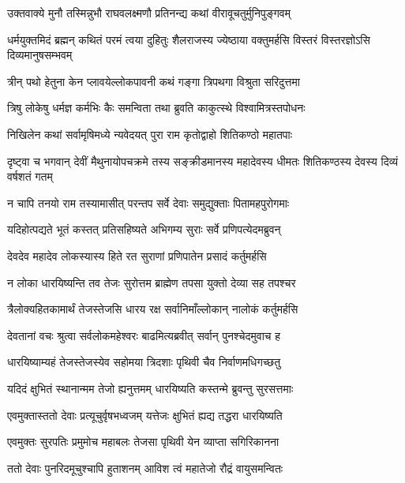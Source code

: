 
\twolineshloka
{उक्तवाक्ये मुनौ तस्मिन्नुभौ राघवलक्ष्मणौ}
{प्रतिनन्द्य कथां वीरावूचतुर्मुनिपुङ्गवम्} %

\threelineshloka
{धर्मयुक्तमिदं ब्रह्मन् कथितं परमं त्वया}
{दुहितुः शैलराजस्य ज्येष्ठाया वक्तुमर्हसि}
{विस्तरं विस्तरज्ञोऽसि दिव्यमानुषसम्भवम्} %

\twolineshloka
{त्रीन् पथो हेतुना केन प्लावयेल्लोकपावनी}
{कथं गङ्गा त्रिपथगा विश्रुता सरिदुत्तमा} %

\twolineshloka
{त्रिषु लोकेषु धर्मज्ञ कर्मभिः कैः समन्विता}
{तथा ब्रुवति काकुत्स्थे विश्वामित्रस्तपोधनः} %

\twolineshloka
{निखिलेन कथां सर्वामृषिमध्ये न्यवेदयत्}
{पुरा राम कृतोद्वाहो शितिकण्ठो महातपाः} %

\threelineshloka
{दृष्ट्वा च भगवान् देवीं मैथुनायोपचक्रमे}
{तस्य सङ्क्रीडमानस्य महादेवस्य धीमतः}
{शितिकण्ठस्य देवस्य दिव्यं वर्षशतं गतम्} %

\twolineshloka
{न चापि तनयो राम तस्यामासीत् परन्तप}
{सर्वे देवाः समुद्युक्ताः पितामहपुरोगमाः} %

\twolineshloka
{यदिहोत्पद्यते भूतं कस्तत् प्रतिसहिष्यते}
{अभिगम्य सुराः सर्वे प्रणिपत्येदमब्रुवन्} %

\twolineshloka
{देवदेव महादेव लोकस्यास्य हिते रत}
{सुराणां प्रणिपातेन प्रसादं कर्तुमर्हसि} %

\twolineshloka
{न लोका धारयिष्यन्ति तव तेजः सुरोत्तम}
{ब्राह्मेण तपसा युक्तो देव्या सह तपश्चर} %

\twolineshloka
{त्रैलोक्यहितकामार्थं तेजस्तेजसि धारय}
{रक्ष सर्वानिमाँल्लोकान् नालोकं कर्तुमर्हसि} %

\twolineshloka
{देवतानां वचः श्रुत्वा सर्वलोकमहेश्वरः}
{बाढमित्यब्रवीत् सर्वान् पुनश्चेदमुवाच ह} %

\twolineshloka
{धारयिष्याम्यहं तेजस्तेजस्येव सहोमया}
{त्रिदशाः पृथिवी चैव निर्वाणमधिगच्छतु} %

\twolineshloka
{यदिदं क्षुभितं स्थानान्मम तेजो ह्यनुत्तमम्}
{धारयिष्यति कस्तन्मे ब्रुवन्तु सुरसत्तमाः} %

\twolineshloka
{एवमुक्तास्ततो देवाः प्रत्यूचुर्वृषभध्वजम्}
{यत्तेजः क्षुभितं ह्यद्य तद्धरा धारयिष्यति} %

\twolineshloka
{एवमुक्तः सुरपतिः प्रमुमोच महाबलः}
{तेजसा पृथिवी येन व्याप्ता सगिरिकानना} %

\twolineshloka
{ततो देवाः पुनरिदमूचुश्चापि हुताशनम्}
{आविश त्वं महातेजो रौद्रं वायुसमन्वितः} %

